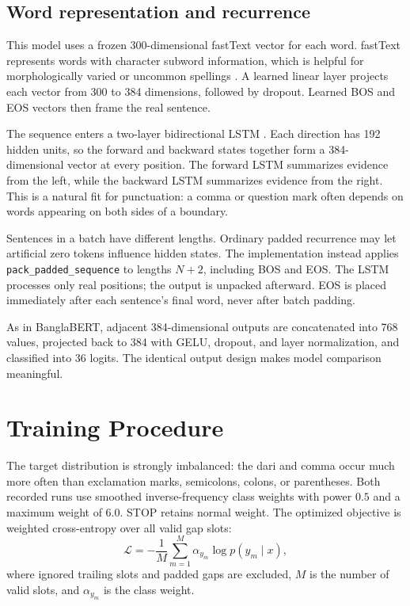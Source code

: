 \documentclass[11pt,a4paper]{article}
\begin{document}
\subsection{Word representation and recurrence}
This model uses a frozen 300-dimensional fastText vector for each word. fastText represents words with character subword information, which is helpful for morphologically varied or uncommon spellings \cite{fasttext}. A learned linear layer projects each vector from 300 to 384 dimensions, followed by dropout. Learned BOS and EOS vectors then frame the real sentence.

The sequence enters a two-layer bidirectional LSTM \cite{lstm}. Each direction has 192 hidden units, so the forward and backward states together form a 384-dimensional vector at every position. The forward LSTM summarizes evidence from the left, while the backward LSTM summarizes evidence from the right. This is a natural fit for punctuation: a comma or question mark often depends on words appearing on both sides of a boundary.

Sentences in a batch have different lengths. Ordinary padded recurrence may let artificial zero tokens influence hidden states. The implementation instead applies \texttt{pack\_padded\_sequence} to lengths $N+2$, including BOS and EOS. The LSTM processes only real positions; the output is unpacked afterward. EOS is placed immediately after each sentence's final word, never after batch padding.

As in BanglaBERT, adjacent 384-dimensional outputs are concatenated into 768 values, projected back to 384 with GELU, dropout, and layer normalization, and classified into 36 logits. The identical output design makes model comparison meaningful.

\section{Training Procedure}
The target distribution is strongly imbalanced: the dari and comma occur much more often than exclamation marks, semicolons, colons, or parentheses. Both recorded runs use smoothed inverse-frequency class weights with power $0.5$ and a maximum weight of $6.0$. STOP retains normal weight. The optimized objective is weighted cross-entropy over all valid gap slots:
\[
\mathcal{L}=-\frac{1}{M}\sum_{m=1}^{M}\alpha_{y_m}\log p(y_m\mid x),
\]
where ignored trailing slots and padded gaps are excluded, $M$ is the number of valid slots, and $\alpha_{y_m}$ is the class weight.
\end{document}
